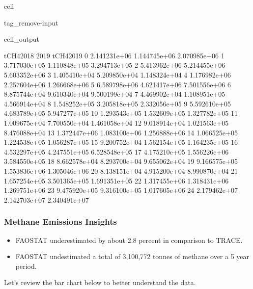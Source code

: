 \documentclass[letterpaper,10pt,english]{jupyterBook}
\begin{document}
\begin{sphinxuseclass}{cell}
\begin{sphinxuseclass}{tag_remove-input}
\begin{sphinxVerbatimOutput}
\begin{sphinxuseclass}{cell_output}
\begin{sphinxVerbatim}[commandchars=\\\{\}]
       tCH4\PYGZus{}2018          2019     tCH4\PYGZus{}2019  
0   2.141231e+06  1.144745e+06  2.070985e+06  
1   3.717030e+05  1.110848e+05  3.294713e+05  
2   5.413962e+06  5.214455e+06  5.603352e+06  
3   1.405410e+04  5.209850e+04  1.148324e+04  
4   1.176982e+06  2.257604e+06  1.266668e+06  
5   6.589798e+06  4.621417e+06  7.501556e+06  
6   8.875744e+04  9.610340e+04  9.500199e+04  
7   4.469902e+04  1.108951e+05  4.566914e+04  
8   1.548252e+05  3.205818e+05  2.332056e+05  
9   5.592610e+05  4.683789e+05  5.947277e+05  
10  1.293543e+05  1.532609e+05  1.327782e+05  
11  1.009675e+04  7.700550e+04  1.461058e+04  
12  9.018914e+04  1.021563e+05  8.476088e+04  
13  1.372447e+06  1.083100e+06  1.256888e+06  
14  1.066525e+05  1.224538e+05  1.056287e+05  
15  9.200752e+04  1.562154e+05  1.164235e+05  
16  4.532297e+05  4.247551e+05  6.528548e+05  
17  4.175210e+05  1.556226e+06  3.584550e+05  
18  8.662578e+04  8.293700e+04  9.655062e+04  
19  9.166575e+05  1.553836e+06  1.305046e+06  
20  8.138151e+04  4.915200e+04  8.990870e+04  
21  1.657254e+05  3.501365e+05  1.691351e+05  
22  1.317455e+06  1.318431e+06  1.269751e+06  
23  9.475920e+05  9.316100e+05  1.017605e+06  
24  2.179462e+07  2.142703e+07  2.340491e+07  
\end{sphinxVerbatim}

\end{sphinxuseclass}\end{sphinxVerbatimOutput}

\end{sphinxuseclass}
\end{sphinxuseclass}

\subsubsection{Methane Emissions Insights}
\label{\detokenize{notebooks/hidden_post:methane-emissions-insights}}\begin{itemize}
\item {} 
\sphinxAtStartPar
FAOSTAT underestimated by about 2.8 percent in comparison to TRACE.

\item {} 
\sphinxAtStartPar
FAOSTAT undestimated a total of 3,100,772 tonnes of methane over a 5 year period.

\end{itemize}

\sphinxAtStartPar
Let’s review the bar chart below to better understand the data.
\end{document}
